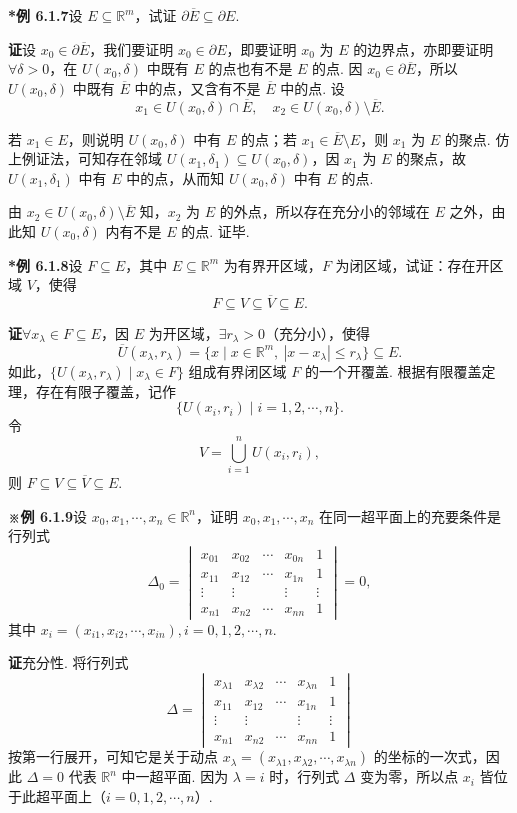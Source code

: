 \documentclass[UTF8,12pt,a4paper,fontset=fandol]{ctexart}
\begin{document}
\noindent\textbf{*例 6.1.7}\quad 设 $E\subseteq\mathbb{R}^m$，试证 $\partial\overline{E}\subseteq\partial E$.

\noindent\textbf{证}\quad 设 $x_0\in\partial\overline{E}$，我们要证明 $x_0\in\partial E$，即要证明 $x_0$ 为 $E$ 的边界点，亦即要证明 $\forall\delta>0$，在 $U(x_0,\delta)$ 中既有 $E$ 的点也有不是 $E$ 的点. 因 $x_0\in\partial\overline{E}$，所以 $U(x_0,\delta)$ 中既有 $\overline{E}$ 中的点，又含有不是 $\overline{E}$ 中的点. 设
\[
  x_1\in U(x_0,\delta)\cap\overline{E},\quad
  x_2\in U(x_0,\delta)\setminus\overline{E}.
\]

若 $x_1\in E$，则说明 $U(x_0,\delta)$ 中有 $E$ 的点；若 $x_1\in\overline{E}\setminus E$，则 $x_1$ 为 $E$ 的聚点. 仿上例证法，可知存在邻域 $U(x_1,\delta_1)\subseteq U(x_0,\delta)$，因 $x_1$ 为 $E$ 的聚点，故 $U(x_1,\delta_1)$ 中有 $E$ 中的点，从而知 $U(x_0,\delta)$ 中有 $E$ 的点.

由 $x_2\in U(x_0,\delta)\setminus\overline{E}$ 知，$x_2$ 为 $E$ 的外点，所以存在充分小的邻域在 $E$ 之外，由此知 $U(x_0,\delta)$ 内有不是 $E$ 的点. 证毕.

\noindent\textbf{*例 6.1.8}\quad 设 $F\subseteq E$，其中 $E\subseteq\mathbb{R}^m$ 为有界开区域，$F$ 为闭区域，试证：存在开区域 $V$，使得
\[
  F\subseteq V\subseteq\overline{V}\subseteq E.
\]

\noindent\textbf{证}\quad $\forall x_\lambda\in F\subseteq E$，因 $E$ 为开区域，$\exists r_\lambda>0$（充分小），使得
\[
  \overline{U}(x_\lambda,r_\lambda)
  =\{x\mid x\in\mathbb{R}^m,\ |x-x_\lambda|\le r_\lambda\}\subseteq E.
\]
如此，$\{U(x_\lambda,r_\lambda)\mid x_\lambda\in F\}$ 组成有界闭区域 $F$ 的一个开覆盖. 根据有限覆盖定理，存在有限子覆盖，记作
\[
  \{U(x_i,r_i)\mid i=1,2,\cdots,n\}.
\]
令
\[
  V=\bigcup_{i=1}^n U(x_i,r_i),
\]
则 $F\subseteq V\subseteq\overline{V}\subseteq E$.

\noindent\textbf{※例 6.1.9}\quad 设 $x_0,x_1,\cdots,x_n\in\mathbb{R}^n$，证明 $x_0,x_1,\cdots,x_n$ 在同一超平面上的充要条件是行列式
\[
  \Delta_0=
  \begin{vmatrix}
  x_{01}&x_{02}&\cdots&x_{0n}&1\\
  x_{11}&x_{12}&\cdots&x_{1n}&1\\
  \vdots&\vdots&&\vdots&\vdots\\
  x_{n1}&x_{n2}&\cdots&x_{nn}&1
  \end{vmatrix}=0,
\]
其中 $x_i=(x_{i1},x_{i2},\cdots,x_{in}),i=0,1,2,\cdots,n$.

\noindent\textbf{证}\quad 充分性. 将行列式
\[
  \Delta=
  \begin{vmatrix}
  x_{\lambda1}&x_{\lambda2}&\cdots&x_{\lambda n}&1\\
  x_{11}&x_{12}&\cdots&x_{1n}&1\\
  \vdots&\vdots&&\vdots&\vdots\\
  x_{n1}&x_{n2}&\cdots&x_{nn}&1
  \end{vmatrix}
\]
按第一行展开，可知它是关于动点 $x_\lambda=(x_{\lambda1},x_{\lambda2},\cdots,x_{\lambda n})$ 的坐标的一次式，因此 $\Delta=0$ 代表 $\mathbb{R}^n$ 中一超平面. 因为 $\lambda=i$ 时，行列式 $\Delta$ 变为零，所以点 $x_i$ 皆位于此超平面上（$i=0,1,2,\cdots,n$）.
\end{document}
